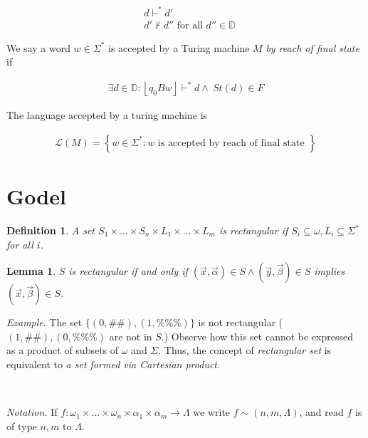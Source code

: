 \documentclass[a4paper, 12pt]{article}
\newtheorem{lemma}{Lemma}
\newtheorem{definition}{Definition}
\newtheorem{lemma}{Lemma}
\begin{document}
\begin{align*}
    &d \vdash^* d' \\ 
    &d' \not\vdash d'' \text{ for all } d'' \in \mathbb{D}
\end{align*}

We say a word $w \in \Sigma^{*}$ is accepted by a Turing machine $M$ \textit{by reach of final
state} if

\begin{align*}
    \exists d \in \mathbb{D} : \left\lfloor q_0 B w \right\rfloor \vdash^* d \land ~ St(d) \in F
\end{align*}

The language accepted by a turing machine is 

\begin{align*}
    \mathcal{L}(M) = \left\{w \in \Sigma^{*}:  w \text{ is accepted by reach of final state } \right\} 
\end{align*}










\pagebreak
\section{Godel}

\begin{definition}
    A set $S_1\times  \ldots  \times  S_n \times L_1 \times  \ldots \times  L_m$ is
    rectangular if $S_i \subseteq \omega, L_i \subseteq \Sigma^{*}$ for all $i$.
\end{definition}

\begin{lemma}
    $S$ is rectangular if and only if $(\overrightarrow{x},
    \overrightarrow{\alpha}) \in S \land (\overrightarrow{y},
    \overrightarrow{\beta}) \in S$ implies $(\overrightarrow{x},
    \overrightarrow{\beta}) \in S$.
\end{lemma}

\textit{Example}. The set $\{(0, \#\#), (1, \%\%\%)\}$ is not rectangular ($(1,
\#\#), (0, \%\%\%)$ are not in $S$.) Observe how this set cannot be expressed as
a product of subsets of $\omega$ and $\Sigma$. Thus, the concept of
\textit{rectangular set} is equivalent to \textit{a set formed via Cartesian
product}.

~

\textit{Notation.} If $f : \omega_1 \times \ldots \times \omega_n \times
\alpha_1 \times \alpha_m \to \Lambda$ we write $f \sim (n, m, \Lambda)$, and
read $f$ is of type $n, m$ to $\Lambda$.
\end{document}
